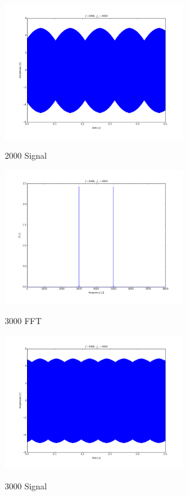 \documentclass[TGAI_Laborbericht.tex]{subfiles}
\begin{document}
\begin{figure}[H]
	\includegraphics[width=0.7\textwidth]{media/2000-signal.png}
	\label{Hoch}
	\caption{2000 Signal}
\end{figure}

\begin{figure}[H]
	\includegraphics[width=0.7\textwidth]{media/3000-fft.png}
	\label{Hoch}
	\caption{3000 FFT}
\end{figure}

\begin{figure}[H]
	\includegraphics[width=0.7\textwidth]{media/3000-signal.png}
	\label{Hoch}
	\caption{3000 Signal}
\end{figure}
\end{document}
